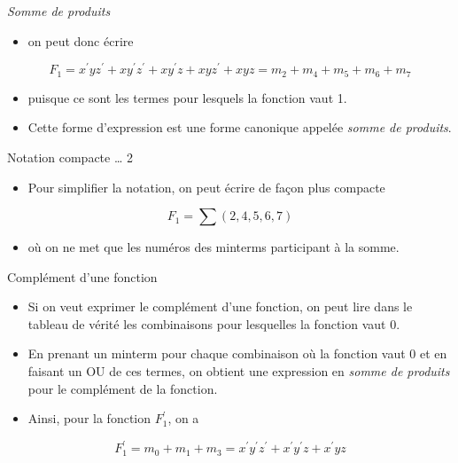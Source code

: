 \documentclass[presentation]{beamer}
\begin{document}
\begin{frame}[label={sec:orgd3c2544}]{\emph{Somme de produits}}
\begin{itemize}
\item on peut donc écrire
\end{itemize}

$$ F_1 =  x^\prime y
z^\prime + x y^\prime z^\prime + x y^\prime z + x y z^\prime + x y z =
m_2 + m_4 + m_5 + m_6 + m_7 $$

\begin{itemize}
\item puisque ce sont les termes pour lesquels la fonction vaut 1.

\item Cette forme d'expression est une forme canonique appelée \emph{somme de produits}.
\end{itemize}
\end{frame}

\begin{frame}[label={sec:org09dcc04}]{Notation compacte \ldots{} 2}
\begin{itemize}
\item Pour simplifier la notation, on peut écrire de façon plus compacte
\end{itemize}

$$F_1 = \sum (2, 4, 5, 6, 7)$$

\begin{itemize}
\item où on ne met que les numéros des minterms participant à la somme.
\end{itemize}
\end{frame}

\begin{frame}[label={sec:org9ad0bca}]{Complément d'une fonction}
\begin{itemize}
\item Si on veut exprimer le complément d'une fonction, on peut lire dans le tableau de vérité les combinaisons pour lesquelles la fonction vaut 0.

\item En prenant un minterm pour chaque combinaison où la fonction vaut 0 et en faisant un OU de ces termes, on obtient une expression en \emph{somme de produits} pour le complément de la fonction.

\item Ainsi, pour la fonction \(F_1^\prime\), on a
\end{itemize}

$$ F_1^\prime = m_0 + m_1 + m_3 = x^\prime y^\prime z^\prime +
x^\prime y^\prime z + x^\prime y z $$
\end{frame}
\end{document}
